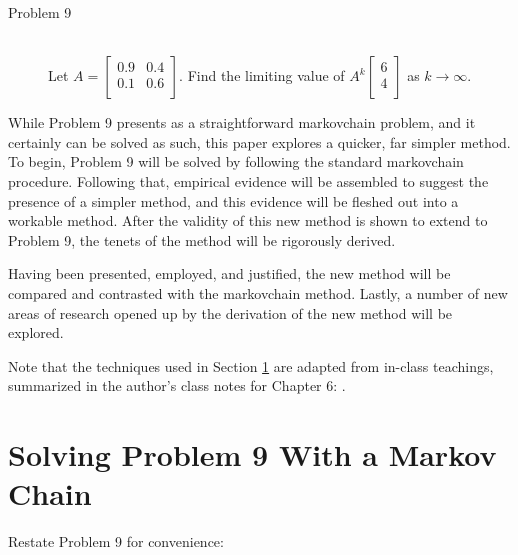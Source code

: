 \documentclass[titlepage]{article}
\begin{document}
\begin{prob}
    \begin{description}
        \item[Problem 9] \hfill \\ Let $
            A =
            \begin{bmatrix}
                0.9 & 0.4\\
                0.1 & 0.6\\
            \end{bmatrix}
        $. Find the limiting value of $
            A^k
            \begin{bmatrix}
                6\\
                4\\
            \end{bmatrix}
        $ as $k\to\infty$.
    \end{description}
\end{prob}

While Problem 9 presents as a straightforward \Gls{markovchain} problem, and it certainly can be solved as such, this paper explores a quicker, far simpler method. To begin, Problem 9 will be solved by following the standard \Gls{markovchain} procedure. Following that, empirical evidence will be assembled to suggest the presence of a simpler method, and this evidence will be fleshed out into a workable method. After the validity of this new method is shown to extend to Problem 9, the tenets of the method will be rigorously derived.\par
Having been presented, employed, and justified, the new method will be compared and contrasted with the \Gls{markovchain} method. Lastly, a number of new areas of research opened up by the derivation of the new method will be explored.\par
Note that the techniques used in Section \ref{sse:markovchain} are adapted from in-class teachings, summarized in the author's class notes for Chapter 6: \cite{bib:ch6notes}.
\newpage



\section{Solving Problem 9 With a Markov Chain}\label{sse:markovchain}
Restate Problem 9 for convenience:
\end{document}
